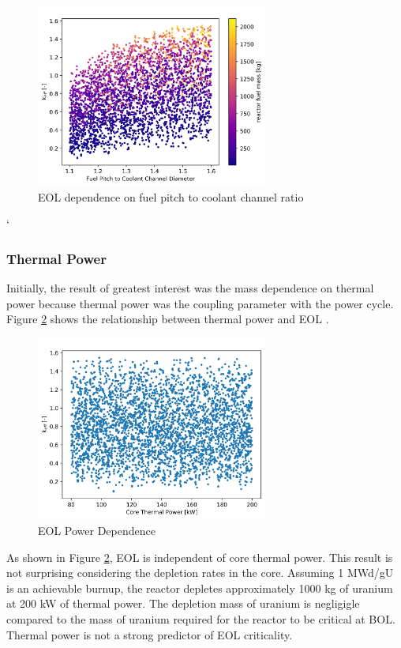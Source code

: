 \begin{figure}[h]
    \centering
    \includegraphics[width=3in]{../images/keff_vs_PD_mass.png}
\caption{EOL \keff dependence on fuel pitch to coolant channel ratio}
\label{fig:eol_keff_vs_PD_mass}
\end{figure}`


\subsubsection{Thermal Power}
Initially, the result of greatest interest was the mass dependence on thermal
power because thermal power was the coupling parameter with the power cycle.
Figure \ref{fig:eol_keff_vs_power} shows the relationship between thermal power
and EOL \keff.

\begin{figure}[h]
    \centering
    \includegraphics[width=3in]{../images/keff_vs_power.png}
\caption{EOL \keff Power Dependence}
\label{fig:eol_keff_vs_power}
\end{figure}

As shown in Figure \ref{fig:eol_keff_vs_power}, EOL \keff is independent of core
thermal power. This result is not surprising considering the depletion rates in
the core. Assuming 1 MWd/gU is an achievable burnup, the reactor depletes
approximately 1000 kg of uranium at 200 kW of thermal power. The depletion mass
of uranium is negligigle compared to the mass of uranium required for the
reactor to be critical at BOL. Thermal power is not a strong predictor of EOL
criticality.

